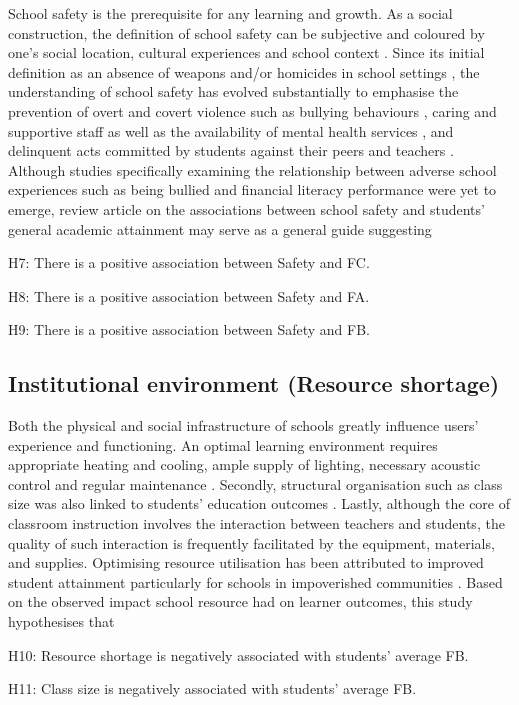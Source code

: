 \documentclass[a4paper,11pt,UKenglish,twoside,openright]{report}\usepackage[]{graphicx}\usepackage[]{color}
\begin{document}
School safety is the prerequisite for any learning and growth. As a social construction, the definition of school safety can be subjective and coloured by one's social location, cultural experiences and school context \parencite{cornell:2010}. Since its initial definition as an absence of weapons and/or  homicides in school settings \parencite{skiba:2006}, the understanding of school safety has evolved substantially to emphasise the prevention of overt and covert violence such as bullying behaviours \parencite[physical safety,][]{jimerson:2012}, caring and supportive staff as well as the availability of mental health services \parencite[emotional safety,][]{kuperminc:1997}, and delinquent acts committed by students against their peers and teachers \parencite[school order and discipline,][]{gottfredson:2005}. Although studies specifically examining the relationship between adverse school experiences such as being bullied and financial literacy performance were yet to emerge,  review article on the associations between school safety and students' general academic attainment may serve as a general guide suggesting
\begin{hyth}
    \item[H7:] There is a positive association between Safety and FC.
    \item[H8:] There is a positive association between Safety and FA.
    \item[H9:] There is a positive association between Safety and FB.
\end{hyth}

\subsection{Institutional environment (Resource shortage)}

Both the physical and social infrastructure of schools greatly influence users' experience and functioning. An optimal learning environment requires appropriate heating and cooling, ample supply of lighting, necessary acoustic control and regular maintenance \parencite[environmental adequacy,][]{uline:2008}. Secondly, structural organisation such as class size was also linked to students' education outcomes \parencite{finn:1999}. Lastly, although the core of classroom instruction involves the interaction between teachers and students, the quality of such interaction is frequently facilitated by the equipment, materials, and supplies. Optimising resource utilisation has been attributed to improved student attainment particularly for schools in impoverished communities \parencite{miles:1998}. Based on the observed impact school resource had on learner outcomes, this study hypothesises that
\begin{hyth}
    \item[H10:] Resource shortage is negatively associated with students' average FB.
    \item[H11:] Class size is negatively associated with students' average FB.
\end{hyth}
\end{document}
